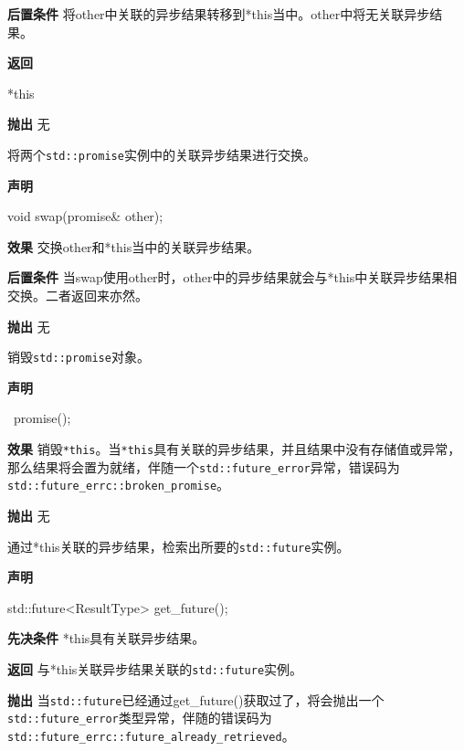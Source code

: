 \textbf{后置条件}
将other中关联的异步结果转移到*this当中。other中将无关联异步结果。

\textbf{返回}

\begin{cpp}
*this
\end{cpp}

\textbf{抛出}
无


将两个\texttt{std::promise}实例中的关联异步结果进行交换。

\textbf{声明}

\begin{cpp}
void swap(promise& other);
\end{cpp}

\textbf{效果}
交换other和*this当中的关联异步结果。

\textbf{后置条件}
当swap使用other时，other中的异步结果就会与*this中关联异步结果相交换。二者返回来亦然。

\textbf{抛出}
无


销毁\texttt{std::promise}对象。

\textbf{声明}

\begin{cpp}
~promise();
\end{cpp}

\textbf{效果}
销毁\texttt{*this}。当\texttt{*this}具有关联的异步结果，并且结果中没有存储值或异常，那么结果将会置为就绪，伴随一个\texttt{std::future\_error}异常，错误码为\texttt{std::future\_errc::broken\_promise}。

\textbf{抛出}
无


通过*this关联的异步结果，检索出所要的\texttt{std::future}实例。

\textbf{声明}

\begin{cpp}
std::future<ResultType> get_future();
\end{cpp}

\textbf{先决条件}
*this具有关联异步结果。

\textbf{返回}
与*this关联异步结果关联的\texttt{std::future}实例。

\textbf{抛出}
当\texttt{std::future}已经通过get\_future()获取过了，将会抛出一个\texttt{std::future\_error}类型异常，伴随的错误码为\texttt{std::future\_errc::future\_already\_retrieved}。


